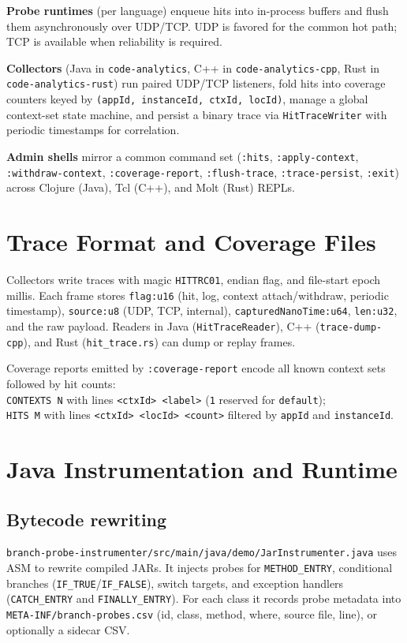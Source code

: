 \documentclass[11pt]{article}
\begin{document}
\textbf{Probe runtimes} (per language) enqueue hits into in-process buffers and flush them asynchronously over UDP/TCP. UDP is favored for the common hot path; TCP is available when reliability is required.

\textbf{Collectors} (Java in \texttt{code-analytics}, C++ in \texttt{code-analytics-cpp}, Rust in \texttt{code-analytics-rust}) run paired UDP/TCP listeners, fold hits into coverage counters keyed by \texttt{(appId, instanceId, ctxId, locId)}, manage a global context-set state machine, and persist a binary trace via \texttt{HitTraceWriter} with periodic timestamps for correlation.

\textbf{Admin shells} mirror a common command set (\texttt{:hits}, \texttt{:apply-context}, \texttt{:withdraw-context}, \texttt{:coverage-report}, \texttt{:flush-trace}, \texttt{:trace-persist}, \texttt{:exit}) across Clojure (Java), Tcl (C++), and Molt (Rust) REPLs.

\section{Trace Format and Coverage Files}
Collectors write traces with magic \texttt{HITTRC01}, endian flag, and file-start epoch millis. Each frame stores \texttt{flag:u16} (hit, log, context attach/withdraw, periodic timestamp), \texttt{source:u8} (UDP, TCP, internal), \texttt{capturedNanoTime:u64}, \texttt{len:u32}, and the raw payload. Readers in Java (\texttt{HitTraceReader}), C++ (\texttt{trace-dump-cpp}), and Rust (\texttt{hit\_trace.rs}) can dump or replay frames.

Coverage reports emitted by \texttt{:coverage-report} encode all known context sets followed by hit counts:\\
\texttt{CONTEXTS N} with lines \texttt{<ctxId> <label>} (\texttt{1} reserved for \texttt{default});\\
\texttt{HITS M} with lines \texttt{<ctxId> <locId> <count>} filtered by \texttt{appId} and \texttt{instanceId}.

\section{Java Instrumentation and Runtime}
\subsection{Bytecode rewriting}
\texttt{branch-probe-instrumenter/src/main/java/demo/JarInstrumenter.java} uses ASM to rewrite compiled JARs. It injects probes for \texttt{METHOD\_ENTRY}, conditional branches (\texttt{IF\_TRUE}/\texttt{IF\_FALSE}), switch targets, and exception handlers (\texttt{CATCH\_ENTRY} and \texttt{FINALLY\_ENTRY}). For each class it records probe metadata into \texttt{META-INF/branch-probes.csv} (id, class, method, where, source file, line), or optionally a sidecar CSV.
\end{document}
